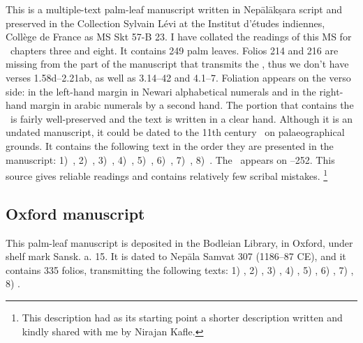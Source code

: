 This is a multiple-text palm-leaf manuscript written in 
Nepālākṣara script and preserved in the 
Collection Sylvain Lévi at the Institut d'études
indiennes, Collège de France as MS Skt 57-B 23. 
I have collated the readings of this MS for \VSS\ 
chapters three and eight.
It contains 249 palm leaves. %
Folios 214 and 216 are missing from the 
part of the manuscript that transmits the \VSS,
thus we don't have verses 1.58d--2.21ab, as well as
3.14--42 and 4.1--7.
Foliation appears on the verso side: in the left-hand margin in
Newari alphabetical numerals and in the right-hand margin 
in arabic numerals by a second hand. 
The portion that contains the \VSS\ is fairly well-preserved and
the text is written in a clear hand. Although it is an undated manuscript, it could be dated to the 11th century \CE\ on palaeographical grounds. 
It contains the following text in the order they are presented in the manuscript:
1)~\SDhS, %
2)~\SDhU, %
3)~\SDhSangr, %
4)~\Ums, %
5)~\SivaUp, %
6)~\Uums, %
7)~\Vss, %
8)~\DharmP. %
The \VSS\ appears on --252.
This source gives reliable readings and contains
relatively few scribal mistakes.%
	\footnote{This description had as its starting point a
			          shorter description written and kindly
			          shared with me by Nirajan Kafle.}








\medskip
\subsection{Oxford manuscript}

This palm-leaf manuscript is deposited in the Bodleian Library, in Oxford, 
under shelf mark %
Sansk. a. 15. It is dated to Nepāla Samvat 307 (1186--87 CE),
and it contains 335 folios, transmitting the following texts: 
1) \SDhS, %
2) \SDhU,
3) \SDhSangr, %
4) \Ums, %
5) \SivaUp, %
6) \Uums, %
7) \Vss, %
8) \DharmP. %

